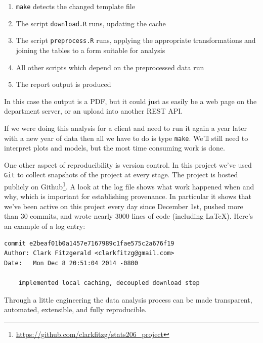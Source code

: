 \documentclass[12pt]{article}
\begin{document}
\begin{enumerate}
    \item \texttt{make} detects the changed template file
    \item The script \texttt{download.R} runs, updating the cache
    \item The script \texttt{preprocess.R} runs, applying the appropriate
        transformations and joining the tables to a form suitable for
        analysis
    \item All other scripts which depend on the preprocessed data run
    \item The report output is produced
\end{enumerate}

In this case the output is a PDF, but it could just as easily be a web page
on the department server, or an upload into another REST API.

If we were doing this analysis for a client and need to run it again a year
later with a new year of data 
then all we have to do is type \texttt{make}. We'll still need to interpret
plots and models, but the most time consuming work is done.

One other aspect of reproducibility is version control. In this
project we've used \texttt{Git} to collect snapshots of the project at
every stage. The project is hosted publicly on
Github\footnote{\url{https://github.com/clarkfitzg/stats206\_project}}.
A look at the log file shows what work happened when and why,
which is important for establishing provenance. In particular it shows 
that we've been active on this project every day since
December 1st, pushed more than 30 commits, and wrote nearly 3000 lines of
code (including \LaTeX). Here's an example of a log entry:

\begin{verbatim}
commit e2beaf01b0a1457e7167989c1fae575c2a676f19
Author: Clark Fitzgerald <clarkfitzg@gmail.com>
Date:   Mon Dec 8 20:51:04 2014 -0800

    implemented local caching, decoupled download step
\end{verbatim}

Through a little engineering the data analysis process
can be made transparent, automated, extensible, and fully reproducible.
\end{document}

